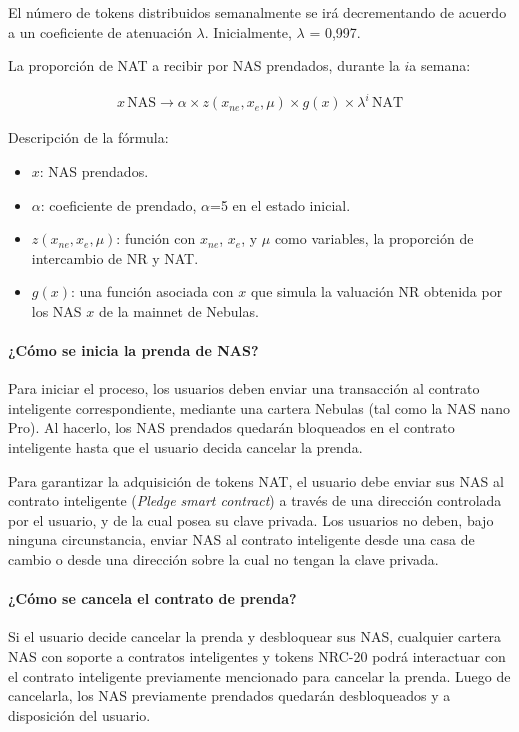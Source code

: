 El número de tokens distribuidos semanalmente se irá decrementando de acuerdo a un coeficiente de atenuación $\lambda$. Inicialmente, $\lambda$ = 0,997.

La proporción de NAT a recibir por NAS prendados, durante la $i$a semana:

\begin{align}
x\,\text{NAS} \rightarrow \alpha \times z(x_{ne},x_{e},\mu)\times g(x) \times
  \lambda^{i}\,\text{NAT}
\end{align}

Descripción de la fórmula:

\begin{itemize}
	\item $x$: NAS prendados.
	\item $\alpha$: coeficiente de prendado, $\alpha$=5 en el estado inicial.
	\item $z(x_{ne},x_{e},\mu)$: función con $x_{ne}$, $x_{e}$, y $\mu$ como variables, la proporción de intercambio de NR y NAT.
	\item $g(x)$: una función asociada con $x$ que simula la valuación NR obtenida por los NAS $x$ de la mainnet de Nebulas.
\end{itemize}

\paragraph{¿Cómo se inicia la prenda de NAS?}
Para iniciar el proceso, los usuarios deben enviar una transacción al contrato inteligente correspondiente, mediante una cartera Nebulas (tal como la NAS nano Pro). Al hacerlo, los NAS prendados quedarán bloqueados en el contrato inteligente hasta que el usuario decida cancelar la prenda.

Para garantizar la adquisición de tokens NAT, el usuario debe enviar sus NAS al contrato inteligente (\textit{Pledge smart contract}) a través de una dirección controlada por el usuario, y de la cual posea su clave privada. Los usuarios no deben, bajo ninguna circunstancia, enviar NAS al contrato inteligente desde una casa de cambio o desde una dirección sobre la cual no tengan la clave privada.

\paragraph{¿Cómo se cancela el contrato de prenda?}

Si el usuario decide cancelar la prenda y desbloquear sus NAS, cualquier cartera NAS con soporte a contratos inteligentes y tokens NRC-20 podrá interactuar con el contrato inteligente previamente mencionado para cancelar la prenda. Luego de cancelarla, los NAS previamente prendados quedarán desbloqueados y a disposición del usuario.

